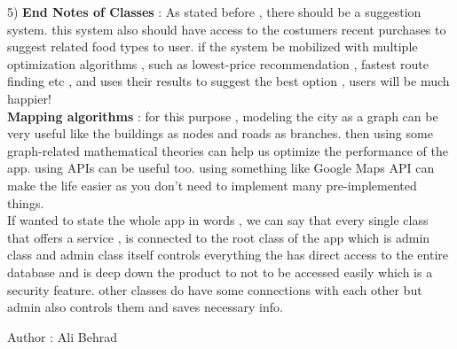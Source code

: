 \documentclass[12pt]{article}
\begin{document}
5) \textbf{End Notes of Classes} :  As stated before , there should be a suggestion system. this system also should have access to the costumers recent purchases to suggest related food types to user. 
if the system be mobilized with multiple optimization algorithms , such as lowest-price recommendation , fastest route finding etc , and uses their results to suggest the best option , users will be much happier! \\

\textbf{Mapping algorithms} : for this purpose , modeling the city as a graph can be very useful like the buildings as nodes and roads as branches. then using some graph-related mathematical theories can help us
optimize the performance of the app. using APIs can be useful too. using something like Google Maps API can make the life easier as you don't need to implement many pre-implemented things. \\

If wanted to state the whole app in words , we can say that every single class that offers a service , is connected to the root class of the app which is admin class and admin class itself controls everything the has direct 
access to the entire database and is deep down the product to not to be accessed easily which is a security feature. other classes do have some connections with each other but admin also controls them and saves necessary info.

\begin{center}
    Author : Ali Behrad
\end{center}
\end{document}
